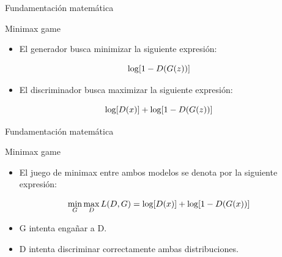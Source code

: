 \begin{frame}{Fundamentación matemática}
    
    \hfill
    \vfill
    {\Large Minimax game}
    \begin{itemize}
        \item El generador busca \alert{minimizar} la siguiente expresión:
    \end{itemize}
    
    \begin{equation}
        \Large \log [1-D(G(z))]
    \end{equation}
    
    \begin{itemize}
        \item El discriminador busca \alert{maximizar} la siguiente expresión:
    \end{itemize}
    
    \begin{equation}
        \Large \log [D(x)]+\log [1-D(G(z))]
    \end{equation}
    
\end{frame}

\begin{frame}{Fundamentación matemática}
    
    \hfill
    \vfill
    {\Large Minimax game}
    \begin{itemize}
        \item El juego de \alert{minimax} entre ambos modelos se denota por la siguiente expresión:
    \end{itemize}
    
    \begin{equation}
        \Large \min _{G} \max _{D} L(D, G)=\log [D(x)]+\log [1-D(G(x))]
    \end{equation}
    
    \begin{itemize}
        \item \alert{G} intenta \alert{engañar} a \alert{D}.
        \item \alert{D} intenta \alert{discriminar} correctamente ambas \alert{distribuciones}.
    \end{itemize}
    
\end{frame}


